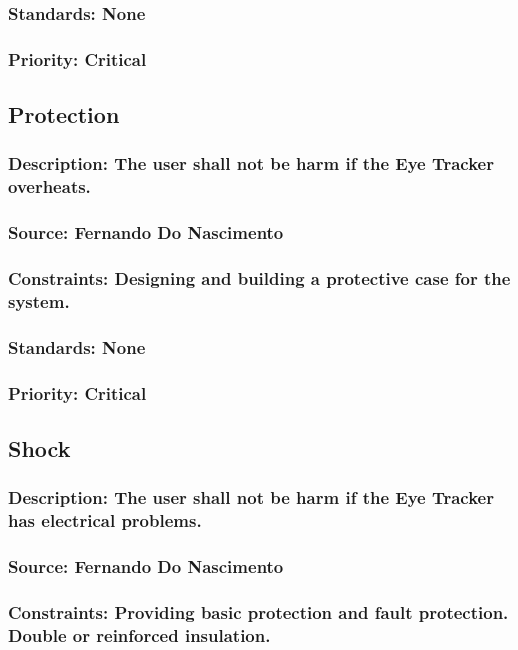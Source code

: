 \subsubsection{Standards: None}
\subsubsection{Priority: Critical}

\subsection{\bfHeat Protection}
\subsubsection{Description: The user shall not be harm if the Eye Tracker overheats.}
\subsubsection{Source: Fernando Do Nascimento}
\subsubsection{Constraints: Designing and building a protective case for the system.}
\subsubsection{Standards: None}
\subsubsection{Priority: Critical}

\subsection{\bfElectrical Shock}
\subsubsection{Description: The user shall not be harm if the Eye Tracker has electrical problems.}
\subsubsection{Source: Fernando Do Nascimento}
\subsubsection{Constraints: Providing basic protection and fault protection. Double or reinforced insulation.
}
